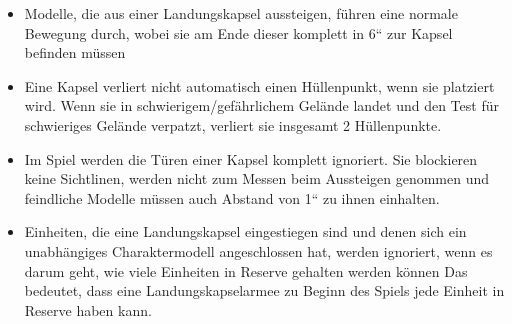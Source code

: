 \begin{itemize}

 \item Modelle, die aus einer Landungskapsel aussteigen, führen eine normale
  Bewegung durch, wobei sie am Ende dieser komplett in 6“ zur Kapsel befinden
  müssen

 \item Eine Kapsel verliert nicht automatisch einen Hüllenpunkt, wenn sie
  platziert wird. Wenn sie in schwierigem/gefährlichem Gelände landet und den
  Test für schwieriges Gelände verpatzt, verliert sie insgesamt 2 Hüllenpunkte.

 \item Im Spiel werden die Türen einer Kapsel komplett ignoriert. Sie blockieren
  keine Sichtlinen, werden nicht zum Messen beim Aussteigen genommen und
  feindliche Modelle müssen auch Abstand von 1“ zu ihnen einhalten.

 \item Einheiten, die eine Landungskapsel eingestiegen sind und denen sich ein
  unabhängiges Charaktermodell angeschlossen hat, werden ignoriert, wenn es
  darum geht, wie viele Einheiten in Reserve gehalten werden können
Das bedeutet, dass eine Landungskapselarmee zu Beginn des Spiels jede Einheit in
Reserve haben kann.

\end{itemize}

